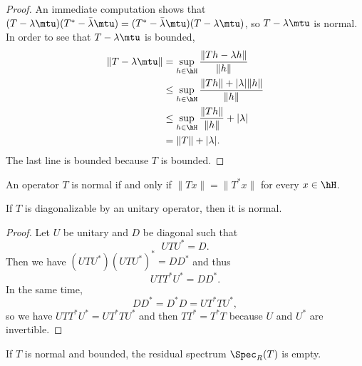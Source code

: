 \begin{proof}
    An immediate computation shows that \( (T-\lambda\mtu)(T^*-\bar\lambda\mtu)=(T^*-\bar\lambda\mtu)(T-\lambda\mtu)\), so \( T-\lambda\mtu\) is normal. In order to see that \( T-\lambda\mtu\) is bounded,
    \begin{subequations}
        \begin{align}
            \| T-\lambda\mtu \|&=\sup_{h\in\hH}\frac{ \| Th-\lambda h \| }{ \| h \| }\\
            &\leq\sup_{h\in\hH}\frac{ \| Th \|+| \lambda|\| h \| }{ \| h \| }\\
            &\leq\sup_{h\in\hH}\frac{ \| Th \| }{ \| h \| }+| \lambda |\\
            &=\| T \|+| \lambda |.
        \end{align}
    \end{subequations}
    The last line is bounded because \( T\) is bounded.
\end{proof}

\begin{proposition}     \label{PropoCartactNormal}
    An operator \( T\) is normal if and only if \( \| Tx \|=\| T^*x \|\) for every \( x\in\hH\).
\end{proposition}

\begin{proposition}
    If \( T\) is diagonalizable by an unitary operator, then it is normal.
\end{proposition}

\begin{proof}
    Let \( U\) be unitary and \( D\) be diagonal such that
    \begin{equation}
        UTU^*=D.
    \end{equation}
    Then we have \( (UTU^*)(UTU^*)^*=DD^*\) and thus
    \begin{equation}
        UTT^*U^*=DD^*.
    \end{equation}
    In the same time,
    \begin{equation}
        DD^*=D^*D=UT^*TU^*,
    \end{equation}
    so we have \( UTT^*U^*=UT^*TU^*\) and then \( TT^*=T^*T\) because \( U\) and \( U^*\) are invertible.
\end{proof}

\begin{proposition}
    If \( T\) is normal and bounded, the residual spectrum \( \Spec_R(T)\) is empty.
\end{proposition}

